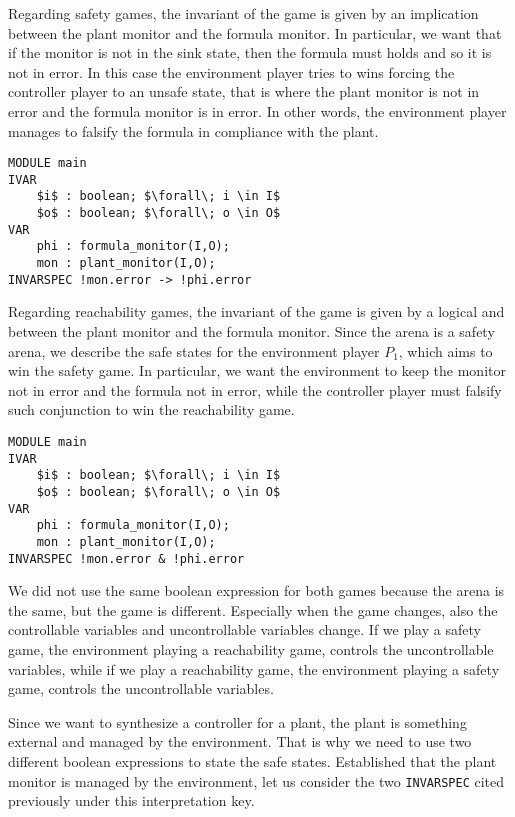 Regarding safety games, the invariant of the game is given by an implication between the plant monitor and the formula monitor.
In particular, we want that if the monitor is not in the sink state, then the formula must holds and so it is not in error.
In this case the environment player tries to wins forcing the controller player to an unsafe state, that is where the plant monitor is not in error and the formula monitor is in error. 
In other words, the environment player manages to falsify the formula in compliance with the plant.

\begin{lstlisting}[language=SMV,mathescape=true, caption=Reduction to synthesis problem: safe states for safety properties]
MODULE main
IVAR
    $i$ : boolean; $\forall\; i \in I$
    $o$ : boolean; $\forall\; o \in O$
VAR
    phi : formula_monitor(I,O);
    mon : plant_monitor(I,O);
INVARSPEC !mon.error -> !phi.error
\end{lstlisting}

Regarding reachability games, the invariant of the game is given by a logical and between the plant monitor and the formula monitor.
Since the arena is a safety arena, we describe the safe states for the environment player $P_1$, which aims to win the safety game.
In particular, we want the environment to keep the monitor not in error and the formula not in error, while the controller player must falsify such conjunction to win the reachability game.

\begin{lstlisting}[language=SMV,mathescape=true, caption=Reduction to synthesis problem: safe states for co-safety properties]
MODULE main
IVAR
    $i$ : boolean; $\forall\; i \in I$
    $o$ : boolean; $\forall\; o \in O$
VAR
    phi : formula_monitor(I,O);
    mon : plant_monitor(I,O);
INVARSPEC !mon.error & !phi.error
\end{lstlisting}

We did not use the same boolean expression for both games because the arena is the same, but the game is different. 
Especially when the game changes, also the controllable variables and uncontrollable variables change.
If we play a safety game, the environment playing a reachability game, controls the uncontrollable variables, while if we play a reachability game, the environment playing a safety game, controls the uncontrollable variables.

Since we want to synthesize a controller for a plant, the plant is something external and managed by the environment. That is why we need to use two different boolean expressions to state the safe states.
Established that the plant monitor is managed by the environment, let us consider the two \lstinline{INVARSPEC} cited previously under this interpretation key.

